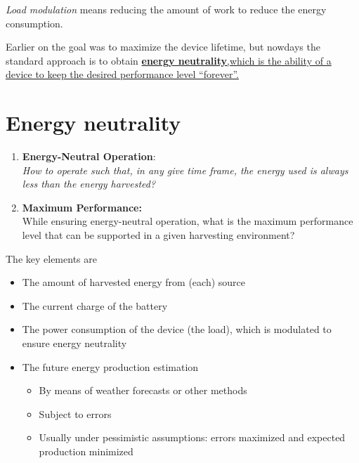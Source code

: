 \textit{Load modulation} means reducing the amount of work
to reduce the energy consumption.

Earlier on the goal was to maximize the device lifetime, but nowdays the standard approach is to obtain \ul{\textbf{energy neutrality},which is the ability of a device to keep the desired performance level ``forever''.} 

\section{Energy neutrality}
\begin{enumerate}
   \item \textbf{Energy-Neutral Operation}:\\
   \textit{How to operate such that, in any give time frame,
   the energy used is always less than the energy harvested?}
   \item \textbf{Maximum Performance:}\\
   While ensuring energy-neutral operation, what is the maximum performance level that can be supported in a given harvesting environment?
\end{enumerate}

The key elements are
\begin{itemize}
   \item The amount of harvested energy from (each) source
   \item The current charge of the battery
   \item The power consumption of the device (the load), which is modulated to ensure energy neutrality
   \item The future energy production estimation
   \begin{itemize}
      \item By means of weather forecasts or other
      methods
      \item Subject to errors
      \item Usually under pessimistic assumptions: errors maximized and expected production minimized
   \end{itemize}
\end{itemize}

